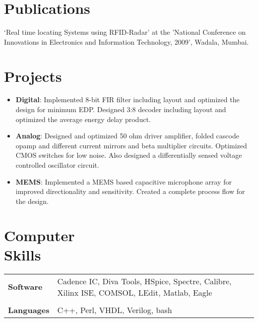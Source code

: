 \documentclass[margin]{res}
\begin{document}
\begin{resume}
\section{Publications}
‘Real time locating Systems using RFID-Radar’ at the 'National Conference on Innovations in Electronics and Information Technology, 2009', Wadala, Mumbai.

\section{Projects}
\begin{itemize}
\item
{\bf Digital}:  Implemented 8-bit FIR filter including layout and optimized the design for minimum EDP. Designed 3:8 decoder including layout and optimized the average energy delay product.
\item
{\bf Analog}: Designed and optimized 50 ohm driver amplifier, folded cascode opamp and different current mirrors and beta multiplier circuits. Optimized CMOS switches for low noise. Also designed a differentially sensed voltage controlled oscillator circuit.
\item
{\bf MEMS}: Implemented a MEMS based capacitive microphone array for improved directionality and sensitivity. Created a complete process flow for the design.
\end{itemize}

\section{Computer \\ Skills}
   \begin{tabular}{l p{3.5in}}
     	{\bf Software} &  Cadence IC, Diva Tools, HSpice, Spectre, Calibre, Xilinx ISE, COMSOL, LEdit, Matlab, Eagle \\\\
	{\bf Languages} & C++, Perl, VHDL, Verilog, bash
 \end{tabular}

\end{resume} 
\end{document}
